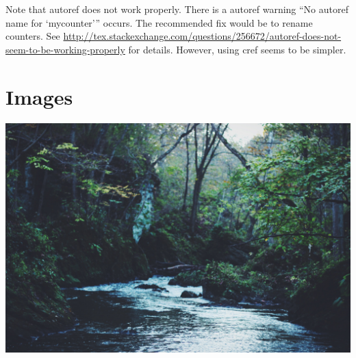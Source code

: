 \documentclass{article}
\numberwithin{equation}{mycounter} %
\numberwithin{table}{mycounter}
\theoremstyle{plain}
\theoremstyle{definition}
\theoremstyle{remark}
\theoremstyle{style1}
\begin{document}
Note that autoref does not work properly.
There is a autoref warning \enquote{No autoref name for \enquote{mycounter}} occurs.
The recommended fix would be to rename counters.
See \url{http://tex.stackexchange.com/questions/256672/autoref-does-not-seem-to-be-working-properly} for details.
However, using cref seems to be simpler.

\section{Images}
\includegraphics[width=1\textwidth]{stream.jpg}

\nocite{*}
\printbibliography[title={Reference}]
\end{document}
